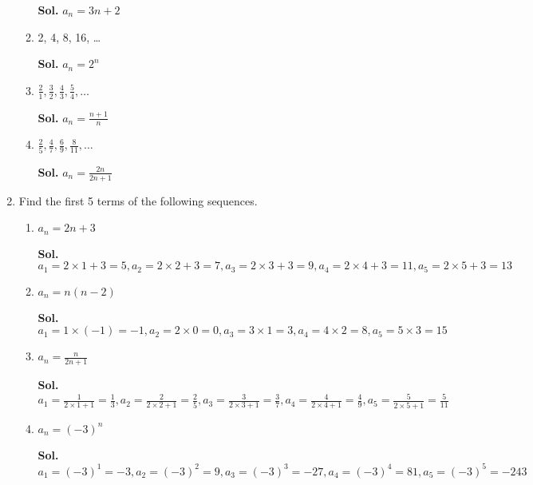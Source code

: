 \documentclass{report}
\begin{document}
\begin{multicols}{2}
\begin{enumerate}
\begin{enumerate}
                  \textbf{Sol.} $a_{n} = 3n+2$

            \item 2, 4, 8, 16, \ldots

                  \textbf{Sol.} $a_{n} = 2^{n}$

            \item $\frac{2}{1}, \frac{3}{2}, \frac{4}{3}, \frac{5}{4}, \ldots$

                  \textbf{Sol.} $a_{n} = \frac{n+1}{n}$

            \item $\frac{2}{5}, \frac{4}{7}, \frac{6}{9}, \frac{8}{11}, \ldots$

                  \textbf{Sol.} $a_{n} = \frac{2n}{2n+1}$
          \end{enumerate}

    \item Find the first 5 terms of the following sequences.

          \begin{enumerate}
            \item $a_{n} = 2n+3$

                  \textbf{Sol.}
                  $a_{1} = 2\times1+3 = 5, a_{2} = 2\times2+3 = 7, a_{3} = 2\times3+3 = 9, a_{4}
                    = 2\times4+3 = 11, a_{5} = 2\times5+3 = 13$

            \item $a_{n} = n(n-2)$

                  \textbf{Sol.}
                  $a_{1} = 1\times(-1) = -1, a_{2} = 2\times0 = 0, a_{3} = 3\times1 = 3, a_{4}
                    = 4\times2 = 8, a_{5} = 5\times3 = 15$

            \item $a_{n} = \frac{n}{2n+1}$

                  \textbf{Sol.}
                  $a_{1} = \frac{1}{2\times1+1}= \frac{1}{3}, a_{2} = \frac{2}{2\times2+1}= \frac{2}{5}
                    , a_{3} = \frac{3}{2\times3+1}= \frac{3}{7}, a_{4} = \frac{4}{2\times4+1}=
                    \frac{4}{9}, a_{5} = \frac{5}{2\times5+1}= \frac{5}{11}$

            \item $a_{n} = (-3)^{n}$

                  \textbf{Sol.}
                  $a_{1} = (-3)^{1} = -3, a_{2} = (-3)^{2} = 9, a_{3} = (-3)^{3} = -27, a_{4}
                    = (-3)^{4} = 81, a_{5} = (-3)^{5} = -243$
          \end{enumerate}


\end{enumerate}
\end{multicols}
\end{document}
